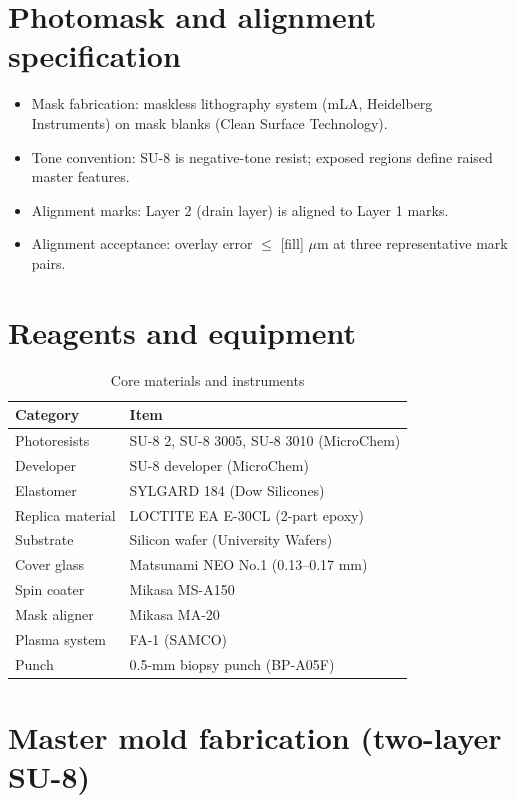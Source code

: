 \section{Photomask and alignment specification}
\begin{itemize}
  \item Mask fabrication: maskless lithography system (\textmu mLA, Heidelberg Instruments) on mask blanks (Clean Surface Technology).
  \item Tone convention: SU-8 is negative-tone resist; exposed regions define raised master features.
  \item Alignment marks: Layer 2 (drain layer) is aligned to Layer 1 marks.
  \item Alignment acceptance: overlay error $\leq$ [fill] $\mu$m at three representative mark pairs.
\end{itemize}

\section{Reagents and equipment}
\begin{table}[H]
\centering
\caption{Core materials and instruments}
\label{tab:fab_materials}
\begin{tabular}{ll}
\hline
\textbf{Category} & \textbf{Item} \\
\hline
Photoresists & SU-8 2, SU-8 3005, SU-8 3010 (MicroChem) \\
Developer & SU-8 developer (MicroChem) \\
Elastomer & SYLGARD 184 (Dow Silicones) \\
Replica material & LOCTITE EA E-30CL (2-part epoxy) \\
Substrate & Silicon wafer (University Wafers) \\
Cover glass & Matsunami NEO No.1 (0.13--0.17 mm) \\
Spin coater & Mikasa MS-A150 \\
Mask aligner & Mikasa MA-20 \\
Plasma system & FA-1 (SAMCO) \\
Punch & 0.5-mm biopsy punch (BP-A05F) \\
\hline
\end{tabular}
\end{table}

\section{Master mold fabrication (two-layer SU-8)}

